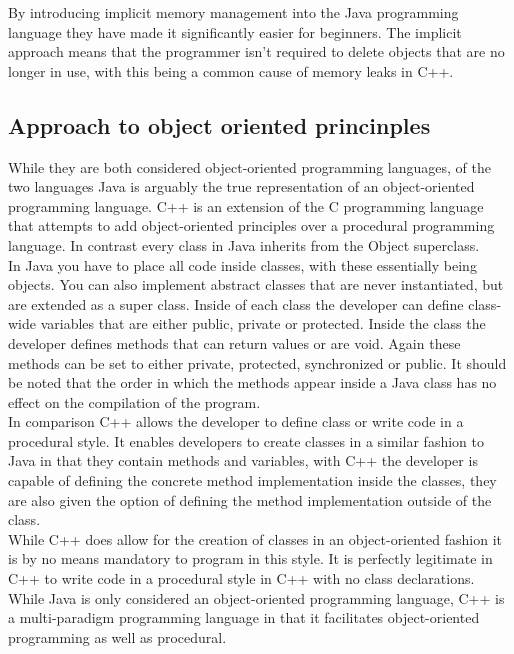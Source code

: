 \documentclass[10pt]{article}  %
\theoremstyle{definition}
\theoremstyle{remark}
\begin{document}
By introducing implicit memory management into the Java programming language they have made it significantly easier for beginners. The implicit approach means that the programmer isn't required to delete objects that are no longer in use, with this being a common cause of memory leaks in C++.\\

\subsection{Approach to object oriented princinples}\label{ss:back}

While they are both considered object-oriented programming languages, of the two languages Java is arguably the true representation of an object-oriented programming language. C++ is an extension of the C programming language that attempts to add object-oriented principles over  a procedural programming language. In contrast every class in Java inherits from the Object superclass.\\

In Java you have to place all code inside classes, with these essentially being objects. You can also implement abstract classes that are never instantiated, but are extended as a super class. Inside of each class the developer can define class-wide variables that are either public, private or protected. Inside the class the developer defines methods that can return values or are void. Again these methods can be set to either private, protected, synchronized or public. It should be noted that the order in which the methods appear inside a Java class has no effect on the compilation of the program.\\

In comparison C++ allows the developer to define class or write code in a procedural style.
It enables developers to create classes in a similar fashion to Java in that they contain methods and variables, with C++ the developer is capable of defining the concrete method implementation inside the classes, they are also given the option of defining the method implementation outside of the class.\\

While C++ does allow for the creation of classes in an object-oriented fashion it is by no means mandatory to program in this style. It is perfectly legitimate in C++ to write code in a procedural style in C++ with no class declarations. While Java is only considered an object-oriented programming language, C++ is a multi-paradigm programming language in that it facilitates object-oriented programming as well as procedural. \\
\end{document}
